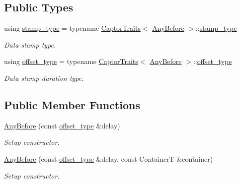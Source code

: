 \subsection*{Public Types}
\begin{DoxyCompactItemize}
\item 
\mbox{\label{classflow_1_1follower_1_1_any_before_aa27f95f5f19c200e0524a3570c9198b0}} 
using \hyperlink{classflow_1_1follower_1_1_any_before_aa27f95f5f19c200e0524a3570c9198b0}{stamp\+\_\+type} = typename \hyperlink{structflow_1_1_captor_traits}{Captor\+Traits}$<$ \hyperlink{classflow_1_1follower_1_1_any_before}{Any\+Before} $>$\+::\hyperlink{classflow_1_1follower_1_1_any_before_aa27f95f5f19c200e0524a3570c9198b0}{stamp\+\_\+type}
\begin{DoxyCompactList}\small\item\em Data stamp type. \end{DoxyCompactList}\item 
\mbox{\label{classflow_1_1follower_1_1_any_before_a6ef017a648741bfd9ca4108556ac8edf}} 
using \hyperlink{classflow_1_1follower_1_1_any_before_a6ef017a648741bfd9ca4108556ac8edf}{offset\+\_\+type} = typename \hyperlink{structflow_1_1_captor_traits}{Captor\+Traits}$<$ \hyperlink{classflow_1_1follower_1_1_any_before}{Any\+Before} $>$\+::\hyperlink{classflow_1_1follower_1_1_any_before_a6ef017a648741bfd9ca4108556ac8edf}{offset\+\_\+type}
\begin{DoxyCompactList}\small\item\em Data stamp duration type. \end{DoxyCompactList}\end{DoxyCompactItemize}
\subsection*{Public Member Functions}
\begin{DoxyCompactItemize}
\item 
\hyperlink{classflow_1_1follower_1_1_any_before_a3ff5b82c3798a2754e8d803424138966}{Any\+Before} (const \hyperlink{classflow_1_1follower_1_1_any_before_a6ef017a648741bfd9ca4108556ac8edf}{offset\+\_\+type} \&delay)
\begin{DoxyCompactList}\small\item\em Setup constructor. \end{DoxyCompactList}\item 
\hyperlink{classflow_1_1follower_1_1_any_before_add93cb4a05f09cb34d4a5dc130e2ad6b}{Any\+Before} (const \hyperlink{classflow_1_1follower_1_1_any_before_a6ef017a648741bfd9ca4108556ac8edf}{offset\+\_\+type} \&delay, const ContainerT \&container)
\begin{DoxyCompactList}\small\item\em Setup constructor. \end{DoxyCompactList}\end{DoxyCompactItemize}
